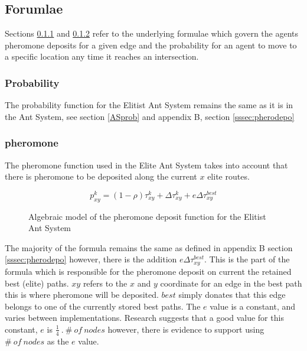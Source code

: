 \subsection{Forumlae}

Sections \ref{EASprob} and \ref{EASphero} refer to the underlying formulae which govern the agents pheromone deposits for a given edge and the probability for an agent to move to a specific location any time it reaches an intersection.

\subsubsection{Probability}
\label{EASprob}

The probability function for the Elitist Ant System remains the same as it is in the Ant System, see section \ref{ASprob} and appendix B, section \ref{sssec:pherodepo}

\subsubsection{pheromone}
\label{EASphero}
The pheromone function used in the Elite Ant System takes into account that there is pheromone to be deposited along the current $x$ elite routes.

\begin{figure}[H]
\Large
\begin{equation}
p_{xy}^{k} = (1 - \rho)\tau_{xy}^{k} + \Delta\tau_{xy}^{k} + e\Delta\tau_{xy}^{best}
\end{equation}

\caption[Elitist Ant System Pheromone Function]{Algebraic model of the pheromone deposit function for the Elitist Ant System \cite{marcdorgio:book:EAS}}
\label{fig:EASpheromonefunc}

\end{figure}

The majority of the formula remains the same as defined in appendix B section \ref{sssec:pherodepo} however, there is the addition $e\Delta\tau_{xy}^{best}$. This is the part of the formula which is responsible for the pheromone deposit on current the retained best (elite) paths. $xy$ refers to the $x$ and $y$ coordinate for an edge in the best path this is where pheromone will be deposited. $best$ simply donates that this edge belongs to one of the currently stored best paths. The $e$ value is a constant, and varies between implementations. Research suggests that a good value for this constant, $e$ is $\frac{1}{4}\ .\ \#\ of \ nodes$ \cite{sjored:Thesus2012:evalue} however, there is evidence to support using $\#\ of \ nodes$ as the $e$ value\cite{marcdorgio:book:nopage}.

